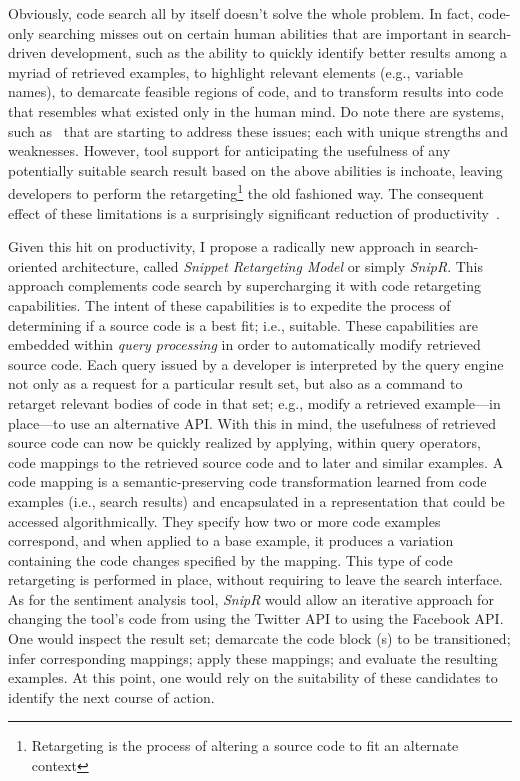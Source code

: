Obviously, code search all by itself doesn't solve the whole problem. In fact, code-only searching misses out on certain human abilities that are important in search-driven development, such as the ability to quickly identify better results among a myriad of retrieved examples, to highlight relevant elements (e.g., variable names), to demarcate feasible regions of code, and to transform results into code that resembles what existed only in the human mind. Do note there are systems, such as~\cite{Bajracharya:2010um, Gysin:2010kt, Hartmann:2010hx, McMillan:2012dj, Sawadsky:2011eh, Wightman:2012gc} that are starting to address these issues; each with unique strengths and weaknesses. However, tool support for anticipating the usefulness of any potentially suitable search result based on the above abilities is inchoate, leaving developers to perform the retargeting\footnote{Retargeting is the process of altering a source code to fit an alternate context} the old fashioned way. The consequent effect of these limitations is a surprisingly significant reduction of productivity~\cite{Cypher:2010ub, Gysin:2010kt}.

Given this hit on productivity, I propose a radically new approach in search-oriented architecture, called \emph{Snippet Retargeting Model} or simply \emph{SnipR}. This approach complements code search by supercharging it with code retargeting capabilities. The intent of these capabilities is to expedite the process of determining if a source code is a best fit; i.e., suitable. These capabilities are embedded within \emph{query processing} in order to automatically modify retrieved source code. Each query issued by a developer is interpreted by the query engine not only as a request for a particular result set, but also as a command to retarget relevant bodies of code in that set; e.g., modify a retrieved example---in place---to use an alternative API. With this in mind, the usefulness of retrieved source code can now be quickly realized by applying, within query operators, code mappings to the retrieved source code and to later and similar examples. A code mapping is a semantic-preserving code transformation learned from code examples (i.e., search results) and encapsulated in a representation that could be accessed algorithmically. They specify how two or more code examples correspond, and when applied to a base example, it produces a variation containing the code changes specified by the mapping. This type of code retargeting is performed in place, without requiring to leave the search interface. As for the sentiment analysis tool, \emph{SnipR} would allow an iterative approach for changing the tool's code from using the Twitter API to using the Facebook API. One would inspect the result set; demarcate the code block (s) to be transitioned; infer corresponding mappings; apply these mappings; and evaluate the resulting examples. At this point, one would rely on the suitability of these candidates to identify the next course of action. 

